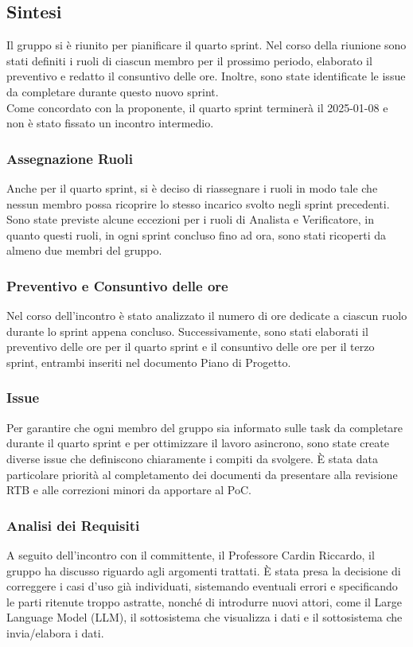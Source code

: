 \documentclass[10pt]{article}
\begin{document}
\subsection{Sintesi}
Il gruppo si è riunito per pianificare il quarto sprint. Nel corso della riunione sono stati definiti i ruoli di ciascun membro per il prossimo periodo, elaborato il preventivo e redatto il consuntivo delle ore. Inoltre, sono state identificate le issue da completare durante questo nuovo sprint.\\
Come concordato con la proponente, il quarto sprint terminerà il 2025-01-08 e non è stato fissato un incontro intermedio.

\subsubsection{Assegnazione Ruoli}
Anche per il quarto sprint, si è deciso di riassegnare i ruoli in modo tale che nessun membro possa ricoprire lo stesso incarico svolto negli sprint precedenti. Sono state previste alcune eccezioni per i ruoli di Analista e Verificatore, in quanto questi ruoli, in ogni sprint concluso fino ad ora, sono stati ricoperti da almeno due membri del gruppo.

\subsubsection{Preventivo e Consuntivo delle ore}
Nel corso dell'incontro è stato analizzato il numero di ore dedicate a ciascun ruolo durante lo sprint appena concluso. Successivamente, sono stati elaborati il preventivo delle ore per il quarto sprint e il consuntivo delle ore per il terzo sprint, entrambi inseriti nel documento Piano di Progetto.

\subsubsection{Issue}
Per garantire che ogni membro del gruppo sia informato sulle task da completare durante il quarto sprint e per ottimizzare il lavoro asincrono, sono state create diverse issue che definiscono chiaramente i compiti da svolgere. È stata data particolare priorità al completamento dei documenti da presentare alla revisione RTB e alle correzioni minori da apportare al PoC.

\subsubsection{Analisi dei Requisiti}
A seguito dell'incontro con il committente, il Professore Cardin Riccardo, il gruppo ha discusso riguardo agli argomenti trattati. È stata presa la decisione di correggere i casi d'uso già individuati, sistemando eventuali errori e specificando le parti ritenute troppo astratte, nonché di introdurre nuovi attori, come il Large Language Model (LLM), il sottosistema che visualizza i dati e il sottosistema che invia/elabora i dati.
\end{document}
